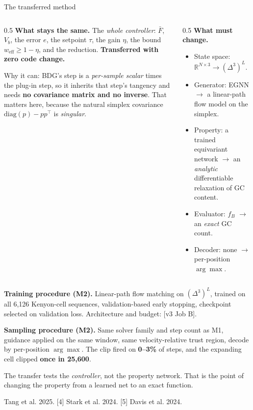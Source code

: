 \documentclass[aspectratio=169,10pt]{beamer}
\newcommand{\theslidelabel}{}
\newcommand{\lbl}[1]{\renewcommand{\theslidelabel}{#1}}
\newcommand{\srcs}[1]{\vfill{\raggedleft\color{grayt}\fontsize{4.9}{5.6}\selectfont #1\par}}
\newcommand{\TODO}[1]{\textcolor{accent}{\scriptsize[#1]}}
\newcommand{\Fbar}{\bar{F}}
\newcommand{\weff}{w_{\mathrm{eff}}}
\newcommand{\Vb}{V_{b}}
\newcommand{\take}[1]{\vspace{0.4ex}\colorbox{black!6}{\parbox{0.97\linewidth}{\footnotesize #1}}}
\begin{document}
\lbl{3a}
\begin{frame}{The transferred method}
  \begin{columns}[T]
  \begin{column}{0.5\textwidth}
    \textbf{What stays the same.} The \emph{whole controller}: $\Fbar$, $\Vb$, the
    error $e$, the setpoint $\tau$, the gain $\eta$, the bound $\weff\ge1-\eta$, and
    the reduction. \textbf{Transferred with zero code change.}
    \smallskip

    Why it can: BDG's step is a \emph{per-sample scalar} times the plug-in step, so
    it inherits that step's tangency and needs \textbf{no covariance matrix and no
    inverse}. That matters here, because the natural simplex covariance
    $\mathrm{diag}(p)-pp^{\!\top}$ is \emph{singular}.
  \end{column}
  \begin{column}{0.5\textwidth}
    \textbf{What must change.}
    \begin{itemize}\setlength\itemsep{0.05em}
      \item State space: $\mathbb{R}^{N\times3}\to(\Delta^3)^L$.
      \item Generator: EGNN $\to$ a linear-path flow model on the simplex.
      \item Property: a trained equivariant network $\to$ an \emph{analytic}
        differentiable relaxation of GC content.
      \item Evaluator: $f_B$ $\to$ an \emph{exact} GC count.
      \item Decoder: none $\to$ per-position $\arg\max$.
    \end{itemize}
  \end{column}
  \end{columns}

  \medskip
  \textbf{Training procedure (M2).} Linear-path flow matching on $(\Delta^3)^L$,
  trained on all 6{,}126 Kenyon-cell sequences, validation-based early stopping,
  checkpoint selected on validation loss. Architecture and budget: \TODO{v3 Job B}.

  \textbf{Sampling procedure (M2).} Same solver family and step count as M1, guidance
  applied on the same window, same velocity-relative trust region, decode by
  per-position $\arg\max$. The clip fired on \textbf{0--3\%} of steps, and the
  expanding cell clipped \textbf{once in 25{,}600}.

  \take{The transfer tests the \emph{controller}, not the property network. That is
  the point of changing the property from a learned net to an exact function.}

  \srcs{[3] Tang et al. 2025. [4] Stark et al. 2024. [5] Davis et al. 2024.}
\end{frame}
\end{document}
